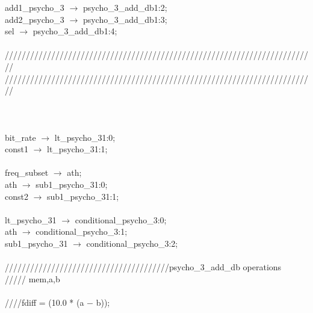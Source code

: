    \hspace*{2em}add1\_psycho\_3 $\rightarrow$ psycho\_3\_add\_db1:2; \\
   \hspace*{2em}add2\_psycho\_3 $\rightarrow$ psycho\_3\_add\_db1:3; \\
   \hspace*{2em}sel $\rightarrow$ psycho\_3\_add\_db1:4; \\
   \\
   \hspace*{2em}////////////////////////////////////////////////////////////////////////// \\
   \hspace*{2em}////////////////////////////////////////////////////////////////////////// \\
   \\
   \\
   \\
   \hspace*{2em}bit\_rate $\rightarrow$ lt\_psycho\_31:0; \\
   \hspace*{2em}const1 $\rightarrow$ lt\_psycho\_31:1; \\
   \\
   \hspace*{2em}freq\_subset $\rightarrow$ ath; \\
   \hspace*{2em}ath $\rightarrow$ sub1\_psycho\_31:0; \\
   \hspace*{2em}const2 $\rightarrow$ sub1\_psycho\_31:1; \\
   \\
   \hspace*{2em}lt\_psycho\_31 $\rightarrow$ conditional\_psycho\_3:0; \\
   \hspace*{2em}ath $\rightarrow$ conditional\_psycho\_3:1; \\
   \hspace*{2em}sub1\_psycho\_31 $\rightarrow$ conditional\_psycho\_3:2;  \\
   \\
   \hspace*{2em}///////////////////////////////////////psycho\_3\_add\_db operations \\
   \hspace*{2em}///// mem,a,b \\
   \\
   \hspace*{2em}////fdiff = (10.0 * (a $-$ b)); \\
